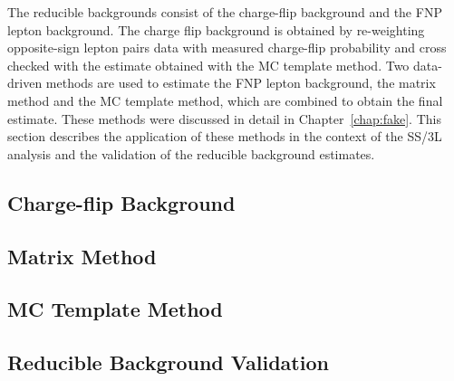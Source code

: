 The reducible backgrounds consist of the charge-flip background and 
the FNP lepton background.
The charge flip background is obtained by re-weighting opposite-sign 
lepton pairs data with measured charge-flip probability and cross checked 
with the estimate obtained with the MC template method.
Two data-driven methods are used to estimate the FNP lepton background, 
the matrix method and the MC template method,
which are combined to obtain the final estimate.  
These methods were discussed in detail in Chapter~\ref{chap:fake}.
This section describes the application of these methods in the 
context of the SS/3L analysis and the validation of the reducible 
background estimates.

\subsection{Charge-flip Background}\label{sec:bkg.red.chflip}


\subsection{Matrix Method}\label{sec:bkg.red.mxm}


\subsection{MC Template Method}\label{sec:bkg.red.mct}


\subsection{Reducible Background Validation}\label{sec:bkg.red.val}

